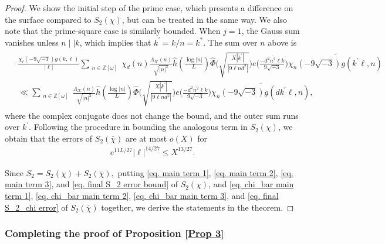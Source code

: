 \documentclass[11pt]{amsart}
\numberwithin{equation}{section}
\theoremstyle{remark}
\begin{document}
\begin{proof}
We show the initial step of the prime case, which presents a difference on the surface compared to $S_2(\chi)$, but can be treated in the same way. We also note that the prime-square case is similarly bounded. When $j=1$, the Gauss sum vanishes unless $n\mid \mid k$, which implies that $k^\prime=k/n=k^*$. 
The sum over $n$ above is
\begin{align*}
\begin{split}
    &\frac{\chi_\ell(-9\sqrt{-3})g(k, \ell)}{|\ell|}
    \sum_{\substack{n\in \mathbb{Z}[\omega]}} {\chi_{d}( n)}\frac{\Lambda_\mathcal{K}(n)}{\sqrt{|n|^3}}
	\hat{h}\left(\frac{\log |n|}{L}\right)
	\widehat{\Phi}\bigg(\sqrt{\frac{X|k^\prime|}{|9{\ell n}d^2|}}\bigg)
    e\bigg(\frac{-\overline{d^2n^2\ell}k}{9\sqrt{-3}}\bigg)
    \overline{\chi_{n}(-9\sqrt{-3})g(k^\prime \ell, n)}
    \\
    &\ll
    \sum_{\substack{n\in \mathbb{Z}[\omega]\\}} \frac{\Lambda_\mathcal{K}(n)}{\sqrt{|n|^3}}
	\hat{h}\left(\frac{\log |n|}{L}\right)
	\widehat{\Phi}\bigg(\sqrt{\frac{X|k^\prime|}{|9{\ell n}d^2|}}\bigg)
    e\bigg(\frac{-\overline{d^2n^2\ell}k}{9\sqrt{-3}}\bigg)
    \overline{\chi_{n}(-9\sqrt{-3})
    g(dk^\prime \ell, n)},
 \end{split}   
\end{align*}
where the complex conjugate does not change the bound, and the outer sum runs over $k^\prime$. Following the procedure in bounding the analogous term in $S_2(\chi)$, we obtain that the errors of $S_2({\overline\chi})$ are at most $o(X)$ for
\begin{align}
\label{eq. final S_2_chi error}
    e^{11L/27}|\ell|^{14/27}\le X^{13/27}.
\end{align}

Since $S_2=S_2(\chi)+S_2(\overline{\chi}),$  putting \eqref{eq. main term 1}, \eqref{eq. main term 2}, \eqref{eq. main term 3}, and \eqref{eq. final S_2 error bound} of $S_2(\chi)$, and \eqref{eq. chi_bar main term 1}, \eqref{eq. chi_bar main term 2}, \eqref{eq. chi_bar main term 3}, and \eqref{eq. final S_2_chi error} of $S_2(\overline{\chi})$ together, we derive the statements in the theorem.
\end{proof}





\subsubsection{Completing the proof of Proposition \ref{Prop 3}}
\end{document}
